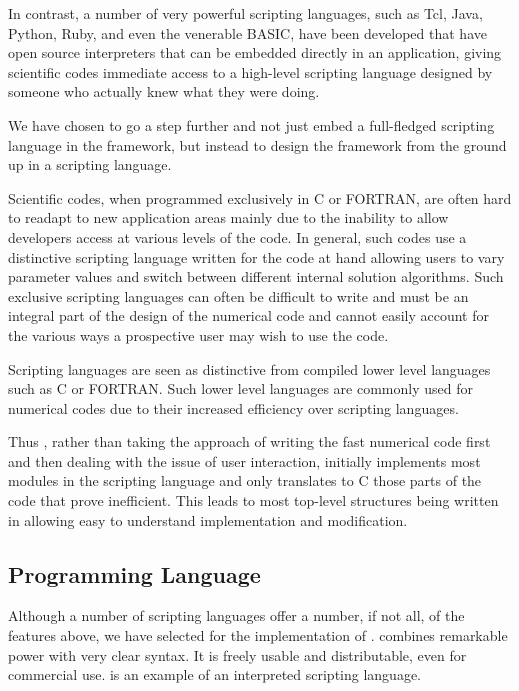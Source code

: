 In contrast, a number of very powerful scripting languages, such as
Tcl, Java, Python, Ruby, and even the venerable BASIC, have been
developed that have open source interpreters that can be embedded
directly in an application, giving scientific codes immediate access
to a high-level scripting language designed by someone who actually
knew what they were doing.

We have chosen to go a step further and not just embed a full-fledged 
scripting language in the \FiPy{} framework, but instead to design the
framework from the ground up in a scripting language.

Scientific codes, when programmed exclusively in C or FORTRAN, are
often hard to readapt to new application areas mainly due to the
inability to allow developers access at various levels of the code.
In general, such codes use a distinctive scripting language written
for the code at hand allowing users to vary parameter values and
switch between different internal solution algorithms.  Such exclusive
scripting languages can often be difficult to write and must be an
integral part of the design of the numerical code and cannot easily
account for the various ways a prospective user may wish to use the
code.

Scripting languages are seen as distinctive from compiled
lower level languages such as C or FORTRAN. Such lower level languages
are commonly used for numerical codes due to their increased
efficiency over scripting languages.  

Thus \FiPy{}, rather than taking the approach of writing the fast
numerical code first and then dealing with the issue of user
interaction, initially implements most modules in the \Python{}
scripting language and only translates to C those parts of the code
that prove inefficient. This leads to most top-level structures being
written in \Python{} allowing easy to understand implementation and
modification. 

\subsection{\Python{} Programming Language}

Although a number of scripting languages offer a number, if not all,
of the features above, we have selected \Python{} for the
implementation of \FiPy{}.  \Python{} combines remarkable power with
very clear syntax.  It is freely usable and distributable, even for
commercial use.  \Python{} is an example of an interpreted scripting
language.  

